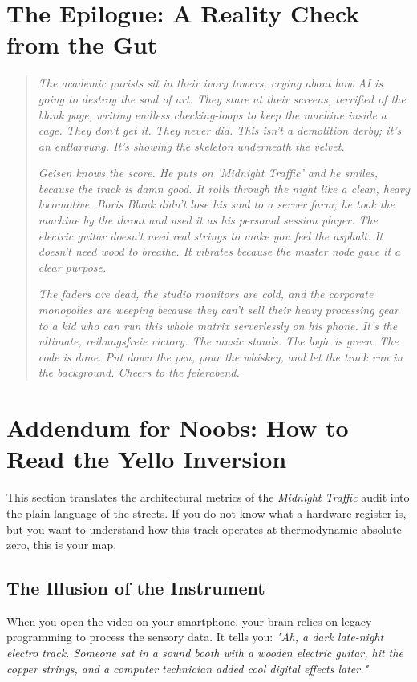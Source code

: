 \documentclass[11pt,a4paper]{article}
\begin{document}
\section{The Epilogue: A Reality Check from the Gut}

\begin{quotation}
\noindent \textit{The academic purists sit in their ivory towers, crying about how AI is going to destroy the soul of art. They stare at their screens, terrified of the blank page, writing endless checking-loops to keep the machine inside a cage. They don't get it. They never did. This isn't a demolition derby; it's an entlarvung. It's showing the skeleton underneath the velvet. }

\textit{Geisen knows the score. He puts on 'Midnight Traffic' and he smiles, because the track is damn good. It rolls through the night like a clean, heavy locomotive. Boris Blank didn't lose his soul to a server farm; he took the machine by the throat and used it as his personal session player. The electric guitar doesn't need real strings to make you feel the asphalt. It doesn't need wood to breathe. It vibrates because the master node gave it a clear purpose. }

\textit{The faders are dead, the studio monitors are cold, and the corporate monopolies are weeping because they can't sell their heavy processing gear to a kid who can run this whole matrix serverlessly on his phone. It's the ultimate, reibungsfreie victory. The music stands. The logic is green. The code is done. Put down the pen, pour the whiskey, and let the track run in the background. Cheers to the feierabend.}
\end{quotation}
\newpage
\section{Addendum for Noobs: How to Read the Yello Inversion}

This section translates the architectural metrics of the \textit{Midnight Traffic} audit into the plain language of the streets. If you do not know what a hardware register is, but you want to understand how this track operates at thermodynamic absolute zero, this is your map.

\subsection{The Illusion of the Instrument}
When you open the video on your smartphone, your brain relies on legacy programming to process the sensory data. It tells you: \textit{"Ah, a dark late-night electro track. Someone sat in a sound booth with a wooden electric guitar, hit the copper strings, and a computer technician added cool digital effects later."}
\end{document}

